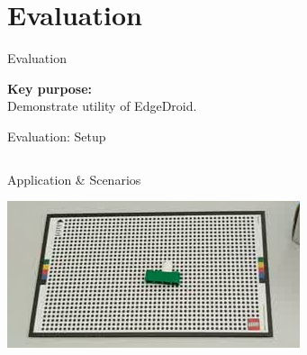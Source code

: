 \documentclass[aspectratio=1610]{beamer}
\begin{document}
\section{Evaluation}
\begin{frame}{Evaluation}
    \begin{center}
        \Large%
        \textbf{Key purpose:}\\
        Demonstrate utility of EdgeDroid.\\
    \end{center}
\end{frame}

\begin{frame}{Evaluation: Setup}
    \begin{columns}[onlytextwidth]
        \begin{column}{.5\linewidth}
            \begin{block}{Application \& Scenarios}
                \begin{center}
                    \includegraphics[width=.7\linewidth]{img/lego/img3.jpeg}


\end{center}
\end{block}
\end{column}
\end{columns}
\end{frame}
\end{document}
